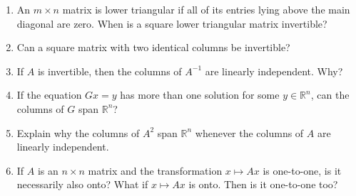 \documentclass[12pt]{article}
\begin{document}
\begin{multicols*}{2}
\begin{enumerate}
		\item An $m\times n$ matrix is lower triangular if all of its entries lying above the main diagonal are zero. When is a square lower triangular matrix invertible?

		\vfill

		\item Can a square matrix with two identical columns be invertible?
		\vfill

		\item If $A$ is invertible, then the columns of $A^{-1}$ are linearly independent. Why?

		\vfill\null\columnbreak

		\item If the equation $Gx = y$ has more than one solution for some $y\in \mathbb{R}^n$, can the columns of $G$ span $\mathbb{R}^n$?
		\vfill

		\item Explain why the columns of $A^2$ span $\mathbb{R}^n$ whenever the columns of $A$ are linearly independent.
		\vfill

		\item If $A$ is an $n\times n$ matrix and the transformation $x\mapsto Ax$ is one-to-one, is it necessarily also onto? What if $x\mapsto Ax$ is onto. Then is it one-to-one too?

		\vfill

	\end{enumerate}	
\end{multicols*}
\end{document}
